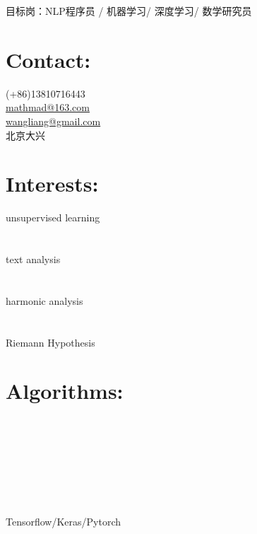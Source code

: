 \documentclass[letterpaper,10pt]{Resume_Liang}
\begin{document}
\thispagestyle{empty}
 {目标岗：NLP程序员 / 机器学习/ 深度学习/ 数学研究员}
\begin{aside}
  \section{Contact:}
    (+86)13810716443\\
    \href{mailto:mathmad@163.com}{mathmad@163.com}\\
    \href{mailto:wangliangster@gmail.com}{wangliang@gmail.com}\\
    北京大兴\\
   \vspace{\baselineskip}
  \section{Interests:}
  unsupervised learning\\
  \\
  \\
   text analysis\\
  \\
  \\
   harmonic analysis\\
  \\
  \\
  Riemann Hypothesis\\
   \vspace{\baselineskip}
  \section{Algorithms:}
  \\
  \\
  \\
  \\
  \\
  \\
  \\
 Tensorflow/Keras/Pytorch\\
  \vspace{\baselineskip}

\end{aside}
\end{document}
